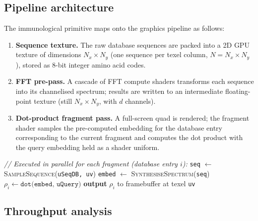 \subsection{Pipeline architecture}

The immunological primitive maps onto the graphics pipeline as follows:

\begin{enumerate}
  \item \textbf{Sequence texture.} The raw database sequences are packed into a
    2D GPU texture of dimensions $N_x \times N_y$ (one sequence per texel
    column, $N = N_x \times N_y$), stored as 8-bit integer amino acid codes.
  \item \textbf{FFT pre-pass.} A cascade of FFT compute shaders
    \citep{moreland2003,govindaraju2008} transforms each sequence into its
    channelised spectrum; results are written to an intermediate floating-point
    texture (still $N_x \times N_y$, with $d$ channels).
  \item \textbf{Dot-product fragment pass.} A full-screen quad is rendered;
    the fragment shader samples the pre-computed embedding for the database
    entry corresponding to the current fragment and computes the dot product
    with the query embedding held as a shader uniform.
\end{enumerate}

\begin{algorithm}
\caption{GPU immunological primitive (pseudocode)}
\label{im:alg:gpu}
\begin{algorithmic}[1]
\Statex \textit{// Executed in parallel for each fragment (database entry $i$):}
  \State \texttt{seq} $\gets$ \textsc{SampleSequence}(\texttt{uSeqDB, uv})
  \State \texttt{embed} $\gets$ \textsc{SynthesiseSpectrum}(\texttt{seq})
    \hfill{}
  \State $\rho_i \gets \texttt{dot(embed,\ uQuery)}$
  \State \textbf{output} $\rho_i$ to framebuffer at texel \texttt{uv}
\EndFunction
\end{algorithmic}
\end{algorithm}

\subsection{Throughput analysis}

